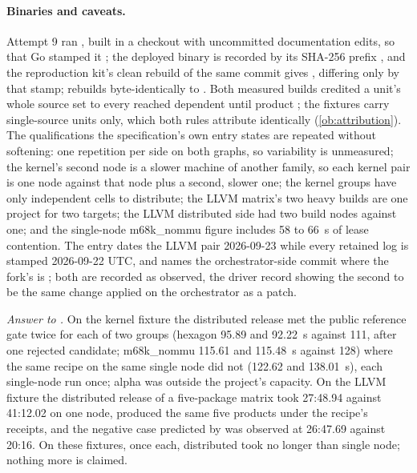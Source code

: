 \paragraph{Binaries and caveats.} Attempt 9 ran
, built in a checkout with uncommitted
documentation edits, so that Go stamped it ; the
deployed binary is recorded by its SHA-256 prefix ,
and the reproduction kit's clean rebuild of the same commit gives
,
differing only by that stamp;  rebuilds byte-identically to
.
Both measured builds credited a unit's whole source set to every reached
dependent until product  ; the fixtures carry
single-source units only, which both rules attribute identically
(\cref{ob:attribution}). The qualifications the specification's own entry
states are repeated without softening: one repetition per side on both
graphs, so variability is unmeasured; the kernel's second node is a slower
machine of another family, so each kernel pair is one node against that node
plus a second, slower one; the kernel groups have only independent cells to
distribute; the LLVM matrix's two heavy builds are one project for two
targets; the LLVM distributed side had two build nodes against one; and the
single-node m68k\_nommu figure includes 58 to 66~s of lease contention. The
entry dates the LLVM pair 2026-09-23 while every retained log is stamped
2026-09-22 UTC, and names the orchestrator-side commit  where
the fork's is ; both are recorded as observed, the driver
record  showing the second to be the same
change applied on the orchestrator as a patch.

\emph{Answer to .} On the kernel fixture the distributed release met
the public reference gate twice for each of two groups (hexagon 95.89 and
92.22~s against 111, after one rejected candidate; m68k\_nommu 115.61 and
115.48~s against 128) where the same recipe on the same single node did not
(122.62 and 138.01~s), each single-node run once; alpha was outside the
project's capacity. On the LLVM fixture the distributed release of a
five-package matrix took 27:48.94 against 41:12.02 on one node, produced the
same five products under the recipe's receipts, and the negative case
predicted by  was observed at 26:47.69 against 20:16. On these
fixtures, once each, distributed took no longer than single node; nothing
more is claimed.

